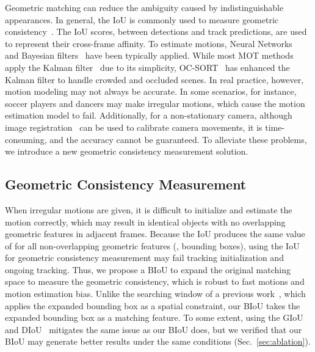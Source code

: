 \documentclass[journal]{IEEEtran}
\begin{document}
Geometric matching can reduce the ambiguity caused by indistinguishable appearances. In general, the IoU is commonly used to measure geometric consistency~\cite{IoUTracker2017, SORT,DeepSORT,JDE,FairMOT,bytetrack,cao2022observation}. The IoU scores, between detections and track predictions, are used to represent their cross-frame affinity. To estimate motions, Neural Networks~\cite{MilanRD0S17} and Bayesian filters~\cite{bar1990tracking, gabriel2003state} have been typically applied. While most MOT methods~\cite{SORT,DeepSORT,JDE,FairMOT,bytetrack} apply the Kalman filter~\cite{kalman1960new} due to its simplicity, OC-SORT~\cite{cao2022observation} has enhanced the Kalman filter to handle crowded and occluded scenes. In real practice, however, motion modeling may not always be accurate. In some scenarios, for instance, soccer players and dancers may make irregular motions, which
cause the motion estimation model to fail. Additionally, for a non-stationary camera, although image registration~\cite{Cioppa_2021_CVPR} can be used to calibrate camera movements, it is time-consuming, and the accuracy cannot be guaranteed. To alleviate these problems, we introduce a new geometric consistency measurement solution.




\subsection{Geometric Consistency Measurement}

When irregular motions are given, it is difficult to initialize and estimate the motion correctly, which may result in identical objects with no overlapping geometric features in adjacent frames. Because the IoU produces the same value of  for all non-overlapping geometric features (\ie, bounding boxes), using the IoU for geometric consistency measurement may fail tracking initialization and ongoing tracking. Thus, we propose a BIoU to expand the original matching space to measure the geometric consistency, which is robust to fast motions and motion estimation bias. Unlike the searching window of a previous work~\cite{yang2022tackling}, which applies the expanded bounding box as a spatial constraint, our BIoU takes the expanded bounding box as a matching feature. To some extent, using the GIoU~\cite{giou2019} and DIoU~\cite{zheng2020distance} mitigates the same issue as our BIoU does, but we verified that our BIoU may generate better results under the same conditions (Sec.~\ref{sec:ablation}).
\end{document}
